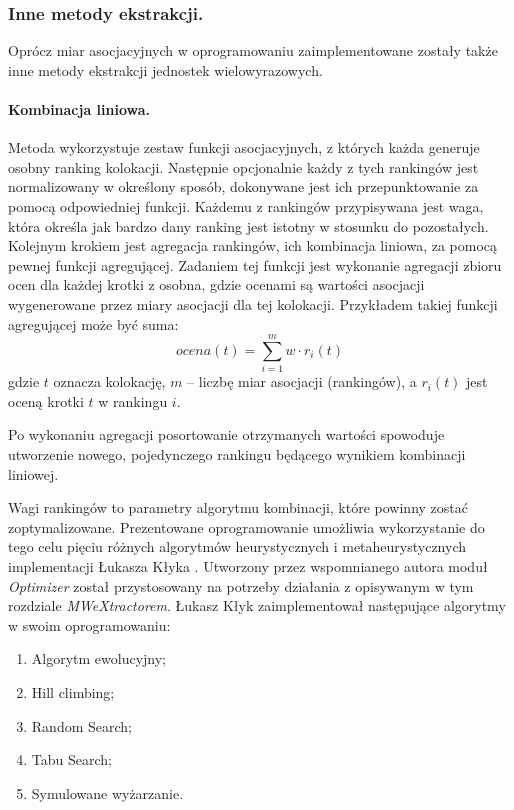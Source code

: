\documentclass[11pt,a4paper]{llncs}
\begin{document}
\subsubsection{Inne metody ekstrakcji.}

Oprócz miar asocjacyjnych w oprogramowaniu zaimplementowane zostały także inne metody ekstrakcji jednostek wielowyrazowych.


\paragraph{Kombinacja liniowa.}

Metoda wykorzystuje zestaw funkcji asocjacyjnych, z których każda generuje osobny ranking kolokacji.
Następnie opcjonalnie każdy z tych rankingów jest normalizowany w określony sposób, dokonywane jest ich przepunktowanie za pomocą odpowiedniej funkcji.
Każdemu z rankingów przypisywana jest waga, która określa jak bardzo dany ranking jest istotny w stosunku do pozostałych.
Kolejnym krokiem jest agregacja rankingów, ich kombinacja liniowa, za pomocą pewnej funkcji agregującej.
Zadaniem tej funkcji jest wykonanie agregacji zbioru ocen dla każdej krotki z osobna, gdzie ocenami są wartości asocjacji wygenerowane przez miary asocjacji dla tej kolokacji.
Przykładem takiej funkcji agregującej może być suma:
$$ ocena(t) = \sum_{i=1}^{m} w \cdot r_{i}(t) $$
gdzie $t$ oznacza kolokację, $m$ -- liczbę miar asocjacji (rankingów), a $r_{i}(t)$ jest oceną krotki $t$ w rankingu $i$.

Po wykonaniu agregacji posortowanie otrzymanych wartości spowoduje utworzenie nowego, pojedynczego rankingu będącego wynikiem kombinacji liniowej.


Wagi rankingów to parametry algorytmu kombinacji, które powinny zostać zoptymalizowane.
Prezentowane oprogramowanie umożliwia wykorzystanie do tego celu pięciu różnych algorytmów heurystycznych i metaheurystycznych implementacji Łukasza Kłyka \cite{klyk}.
Utworzony przez wspomnianego autora moduł \emph{Optimizer} został przystosowany na potrzeby działania z opisywanym w tym rozdziale \emph{MWeXtractorem}.
Łukasz Kłyk zaimplementował następujące algorytmy w swoim oprogramowaniu:

\begin{enumerate}
	\item Algorytm ewolucyjny;
	\item Hill climbing;
	\item Random Search;
	\item Tabu Search; 
	\item Symulowane wyżarzanie.
\end{enumerate}
\end{document}
